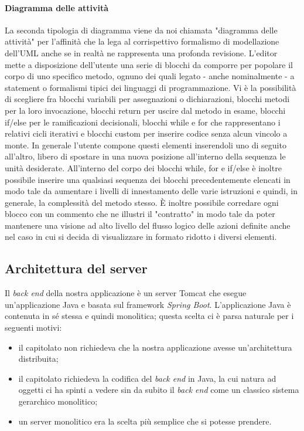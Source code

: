 	\paragraph{Diagramma delle attività}
La seconda tipologia di diagramma viene da noi chiamata "diagramma delle attività" per l'affinità che la lega al corrispettivo formalismo di modellazione dell'UML anche se in realtà ne rappresenta una profonda revisione. L'editor mette a disposizione dell'utente una serie di blocchi da comporre per popolare il corpo di uno specifico metodo, ognuno dei quali legato - anche nominalmente - a statement o formalismi tipici dei linguaggi di programmazione. Vi è la possibilità di scegliere fra blocchi variabili per assegnazioni o dichiarazioni, blocchi metodi per la loro invocazione, blocchi return per uscire dal metodo in esame, blocchi if/else per le ramificazioni decisionali, blocchi while e for che rappresentano i relativi cicli iterativi e blocchi custom per inserire codice senza alcun vincolo a monte.
In generale l'utente compone questi elementi inserendoli uno di seguito all'altro, libero di spostare in una nuova posizione all'interno della sequenza le unità desiderate.
All'interno del corpo dei blocchi while, for e if/else è inoltre possibile inserire una qualsiasi sequenza dei blocchi precedentemente elencati in modo tale da aumentare i livelli di innestamento delle varie istruzioni e quindi, in generale, la complessità del metodo stesso.
È inoltre possibile corredare ogni blocco con un commento che ne illustri il "contratto" in modo tale da poter mantenere una visione ad alto livello del flusso logico delle azioni definite anche nel caso in cui si decida di visualizzare in formato ridotto i diversi elementi.




\subsection{Architettura del server} \label{sec:arch_server}

Il \emph{back end} della nostra applicazione \`e un server Tomcat che esegue un'applicazione Java e basata sul framework \emph{Spring Boot}. L'applicazione Java \`e contenuta in sé stessa e quindi monolitica; questa scelta ci \`e parsa naturale per i seguenti motivi:
\begin{itemize}
	\item il capitolato non richiedeva che la nostra applicazione avesse un'architettura distribuita;
	\item il capitolato richiedeva la codifica del \emph{back end} in Java, la cui natura ad oggetti ci ha spinti a vedere sin da subito il \emph{back end} come un classico sistema gerarchico monolitico;
	\item un server monolitico era la scelta pi\`u semplice che si potesse prendere.
\end{itemize}

